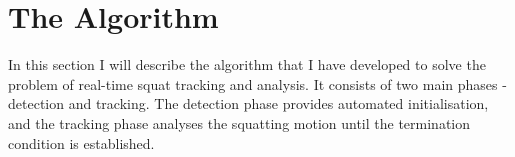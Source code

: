 \section{The Algorithm}

In this section I will describe the algorithm that I have developed to solve the problem of real-time squat tracking and analysis. It consists of two main phases - detection and tracking. The detection phase provides automated initialisation, and the tracking phase analyses the squatting motion until the termination condition is established.



